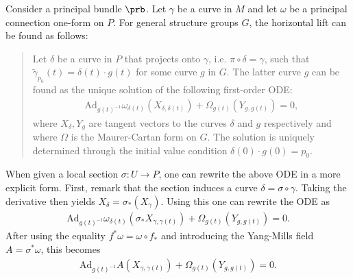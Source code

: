     \begin{method}
        Consider a principal bundle $\prb$. Let $\gamma$ be a curve in $M$ and let $\omega$ be a principal connection one-form on $P$. For general structure groups $G$, the horizontal lift can be found as follows:
        \begin{quote}
            Let $\delta$ be a curve in $P$ that projects onto $\gamma$, i.e. $\pi\circ\delta=\gamma$, such that $\widetilde\gamma_{p_0}(t)=\delta(t)\cdot g(t)$ for some curve $g$ in $G$. The latter curve $g$ can be found as the unique solution of the following first-order ODE:
            \begin{gather}
                \label{bundle:horizontal_ode}
                \mathrm{Ad}_{g(t)^{-1}}\omega_{\delta(t)}(X_{\delta,\delta(t)}) + \Omega_{g(t)}(Y_{g,g(t)}) = 0,
            \end{gather}
            where $X_\delta,Y_g$ are tangent vectors to the curves $\delta$ and $g$ respectively and where $\Omega$ is the Maurer-Cartan form on $G$. The solution is uniquely determined through the initial value condition $\delta(0)\cdot g(0) = p_0$.
        \end{quote}
    \end{method}
    \begin{remark}
        When given a local section $\sigma:U\rightarrow P$, one can rewrite the above ODE in a more explicit form. First, remark that the section induces a curve $\delta = \sigma\circ\gamma$. Taking the derivative then yields $X_\delta = \sigma_*(X_\gamma)$. Using this one can rewrite the ODE as
        \begin{gather}
            \mathrm{Ad}_{g(t)^{-1}}\omega_{\delta(t)}(\sigma_*X_{\gamma,\gamma(t)}) + \Omega_{g(t)}(Y_{g,g(t)}) = 0.
        \end{gather}
        After using the equality $f^*\omega = \omega\circ f_*$ and introducing the Yang-Mills field $A = \sigma^*\omega$, this becomes
        \begin{gather}
            \mathrm{Ad}_{g(t)^{-1}}A(X_{\gamma,\gamma(t)}) + \Omega_{g(t)}(Y_{g,g(t)}) = 0.
        \end{gather}
    \end{remark}

